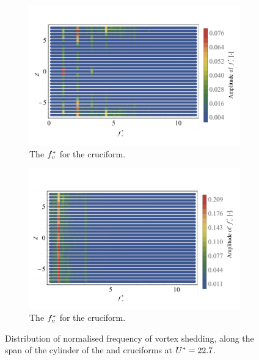 \documentclass[oneside]{utmthesis}
\begin{document}
\begin{figure}
  \centering

  \begin{subfigure}[h]{1\textwidth}
    \includegraphics[width=\textwidth]{figs/probe225YU10}
    \caption{The $f^{*}_{v}$ for the \angtw{} cruciform.}
    \label{fig:probe225YU10}
  \end{subfigure}

  \begin{subfigure}[h]{1\textwidth}
    \includegraphics[width=\textwidth]{figs/probe00YU10}
    \caption{The $f^{*}_{v}$ for the \angon{} cruciform.}
    \label{fig:probe00YU10}
  \end{subfigure}

  \caption{Distribution of normalised frequency of vortex shedding, along the span of the cylinder of the \angtw{} and \angon{} cruciforms at $U^{*} = 22.7$.}
  \label{fig:probe22500YU10}
\end{figure}
\end{document}

